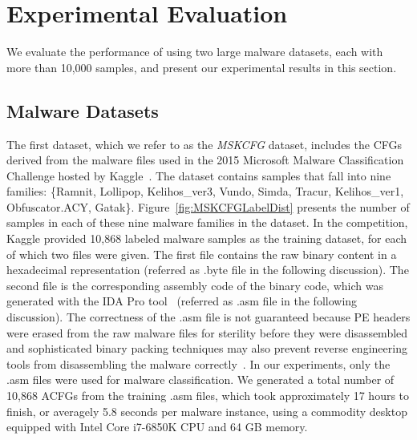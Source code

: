 \section{Experimental Evaluation}
\label{MG:Sec:Experiment}

We evaluate the performance of \sysname using two large malware datasets, each with more than 10,000 samples, and present our experimental results in this section.

\subsection{Malware Datasets}
The first dataset, which we refer to as the \textit{MSKCFG} dataset, includes the CFGs derived from the malware files used in the 2015 Microsoft Malware Classification Challenge hosted by Kaggle~\cite{MsAcfgDataset}. The dataset contains samples that fall into nine families: \{Ramnit, Lollipop, Kelihos\_ver3, Vundo, Simda, Tracur, Kelihos\_ver1, Obfuscator.ACY, Gatak\}.
Figure~\ref{fig:MSKCFGLabelDist} presents the number of samples in each of these nine malware families in the dataset.
In the competition, Kaggle provided 10,868 labeled malware samples as the training dataset, for each of which two files were given.
The first file contains the raw binary content in a hexadecimal representation (referred as .byte file in the following discussion).
The second file is the corresponding assembly code of the binary code, which was generated with the IDA Pro tool~\cite{bib:idapro} (referred as .asm file in the following discussion).
The correctness of the .asm file is not guaranteed because PE headers were erased from the raw malware files for sterility before they were disassembled and sophisticated binary packing techniques may also prevent reverse engineering tools from disassembling the malware correctly~\cite{BinaryUnpacking}. 
In our experiments, only the .asm files were used for malware classification.
We generated a total number of 10,868 ACFGs from the training .asm files, which took approximately 17 hours to finish, or averagely 5.8 seconds per malware instance,
using a commodity desktop equipped with Intel Core i7-6850K CPU and 64 GB memory.

